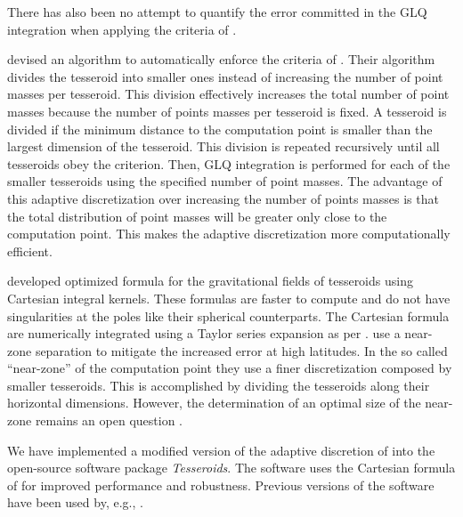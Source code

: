 \documentclass[paper,twocolumn,twoside]{geophysics}
\begin{document}
There has also been no attempt to quantify the error committed in the GLQ
integration when applying the criteria of \citet{Ku1977}.


\citet{Li2011} devised an algorithm to automatically enforce the criteria of
\citet{Ku1977}.
Their algorithm divides the tesseroid into smaller ones instead of increasing
the number of point masses per tesseroid.
This division effectively increases the total number of point masses
because the number of points masses per tesseroid is fixed.
A tesseroid is divided if the minimum distance to the computation point
is smaller than the largest dimension of the tesseroid.
This division is repeated recursively until all tesseroids obey the criterion.
Then, GLQ integration is performed for each of the smaller tesseroids
using the specified number of point masses.
The advantage of this adaptive discretization over
increasing the number of points masses is that the
total distribution of point masses will be greater
only close to the computation point.
This makes the adaptive discretization more computationally efficient.


\citet{Grombein2013} developed optimized formula for the gravitational fields
of tesseroids using Cartesian integral kernels.
These formulas are faster to compute and do not have singularities at the poles
like their spherical counterparts.
The Cartesian formula are numerically integrated using a Taylor series
expansion as per \citet{Heck2007}.
\citet{Grombein2013} use a near-zone separation to mitigate the increased error
at high latitudes.
In the so called ``near-zone'' of the computation point they use a finer
discretization composed by smaller tesseroids.
This is accomplished by dividing the tesseroids along their horizontal
dimensions.
However, the determination of an optimal size of the near-zone remains an
open question \citep{Grombein2013}.


We have implemented a modified version of the adaptive discretion of
\citet{Li2011} into the open-source software package \emph{Tesseroids}.
The software uses the Cartesian formula of \citet{Grombein2013} for improved
performance and robustness.
Previous versions of the software have been used by, e.g.,
\citet{Alvarez2012, Bouman2013, Bouman2013a, Mariani2013, Braitenberg2014,
Braitenberg2011, Fullea2014}.
\end{document}
